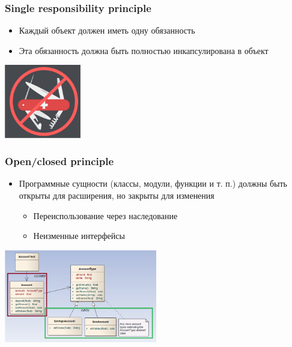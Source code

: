 \documentclass{../../slides-style}
\begin{document}
    \begin{frame}
        \frametitle{Single responsibility principle}
        \begin{itemize}
            \item Каждый объект должен иметь одну обязанность
            \item Эта обязанность должна быть полностью инкапсулирована в объект
        \end{itemize}
        \begin{flushright}
            \includegraphics[width=0.25\textwidth]{singleResponsibility.png}
        \end{flushright}
    \end{frame}

    \begin{frame}
        \frametitle{Open/closed principle}
        \begin{itemize}
            \item Программные сущности (классы, модули, функции и т. п.) должны быть открыты для расширения, но закрыты для изменения
            \begin{itemize}
                \item Переиспользование через наследование
                \item Неизменные интерфейсы
            \end{itemize}
        \end{itemize}
        \begin{flushright}
            \includegraphics[width=0.5\textwidth]{openClosedPrinciple.png}
        \end{flushright}
    \end{frame}
\end{document}
